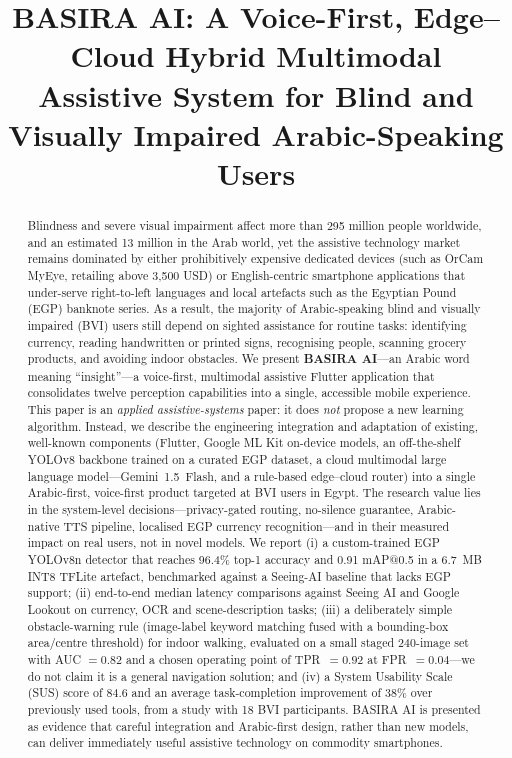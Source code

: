 \documentclass[11pt,a4paper]{article}
\begin{document}
\title{BASIRA AI: A Voice-First, Edge--Cloud Hybrid Multimodal Assistive
System for Blind and Visually Impaired Arabic-Speaking Users}

\maketitle
\date{}

\begin{abstract}
Blindness and severe visual impairment affect more than 295 million people
worldwide, and an estimated 13 million in the Arab world, yet the assistive
technology market remains dominated by either prohibitively expensive dedicated
devices (such as OrCam MyEye, retailing above 3{,}500 USD) or English-centric
smartphone applications that under-serve right-to-left languages and local
artefacts such as the Egyptian Pound (EGP) banknote series. As a result, the
majority of Arabic-speaking blind and visually impaired (BVI) users still depend
on sighted assistance for routine tasks: identifying currency, reading
handwritten or printed signs, recognising people, scanning grocery products,
and avoiding indoor obstacles. We present \textbf{BASIRA AI}---an Arabic word
meaning ``insight''---a voice-first, multimodal assistive Flutter application
that consolidates twelve perception capabilities into a single, accessible
mobile experience. This paper is an \emph{applied assistive-systems} paper:
it does \emph{not} propose a new learning algorithm. Instead, we describe the
engineering integration and adaptation of existing, well-known components
(Flutter, Google ML Kit on-device models, an off-the-shelf YOLOv8
backbone trained on a curated EGP dataset, a cloud multimodal large language
model---Gemini~1.5~Flash, and a rule-based edge--cloud router) into a
single Arabic-first, voice-first product targeted at BVI users in Egypt.
The research value lies in the system-level decisions---privacy-gated
routing, no-silence guarantee, Arabic-native TTS pipeline, localised EGP
currency recognition---and in their measured impact on real users, not in
novel models. We report (i) a custom-trained EGP YOLOv8n detector that
reaches 96.4\% top-1 accuracy and 0.91 mAP@0.5 in a 6.7~MB INT8 TFLite
artefact, benchmarked against a Seeing-AI baseline that lacks EGP support;
(ii) end-to-end median latency comparisons against Seeing AI and Google
Lookout on currency, OCR and scene-description tasks; (iii) a deliberately
simple obstacle-warning rule (image-label keyword matching fused with a
bounding-box area/centre threshold) for indoor walking, evaluated on a
small staged 240-image set with AUC $=0.82$ and a chosen operating point
of TPR~$=0.92$ at FPR~$=0.04$---we do not claim it is a general
navigation solution; and (iv) a System Usability Scale (SUS) score of 84.6
and an average task-completion improvement of 38\% over previously used
tools, from a study with 18 BVI participants. BASIRA AI is presented as
evidence that careful integration and Arabic-first design, rather than new
models, can deliver immediately useful assistive technology on commodity
smartphones.
\end{abstract}
\end{document}

